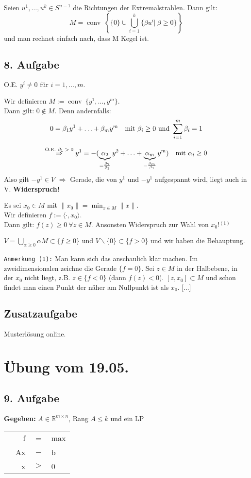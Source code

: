 \documentclass[a4paper,11pt,twoside,titlepage]{article}
\newcommand{\R}{{\mathbb R}}
\newcommand{\conv}{{\operatorname{conv}\:}}
\begin{document}
Seien $u^1,\ldots,u^k\in S^{n-1}$ die Richtungen der Extremalstrahlen. Dann gilt:
\[M=\conv\left\{\{0\}\cup\bigcup_{i=1}^k\{\beta u^i|\: \beta\geq 0\}\right\}\]
und man rechnet einfach nach, dass M Kegel ist.

\subsection*{8. Aufgabe}
O.E. $y^i\neq 0$ für $i=1,\ldots,m$.

Wir definieren $M:=\conv\{y^1,\ldots,y^m\}$.\\
Dann gilt: $0\not\in M$. Denn andernfalls:
\[0=\beta_1y^1+\ldots+\beta_my^m\quad\textnormal{mit }\beta_i\geq0\textnormal{ und }\sum_{i=1}^m\beta_i=1\]

\[\stackrel{\textnormal{\scriptsize{O.E. \ensuremath{\beta_1>0}}}}{\Rightarrow}y^1=-(\underbrace{\alpha_2}_{=\frac{\beta_2}{\beta_1}}y^2+\ldots+\underbrace{\alpha_m}_{=\frac{\beta_m}{\beta_1}}y^m)\quad\textnormal{mit }\alpha_i\geq0\]
Also gilt $-y^1\in V$ $\Rightarrow$ Gerade, die von $y^1$ und $-y^1$ aufgespannt wird, liegt auch in V. \textbf{Widerspruch!}


Es sei $x_0\in M$ mit $\|x_0\|=\min_{x\in M}\|x\|$.\\
Wir definieren $f:=\langle\cdot,x_0\rangle$.\\
Dann gilt: $f(z)\geq0\ \forall z\in M$. Ansonsten Widerspruch zur Wahl von $x_0$!$^{(1)}$

$V=\bigcup_{\alpha\geq0}\alpha M\subset\{f\geq0\}$ und $V\backslash\{0\}\subset\{f>0\}$ und wir haben die Behauptung.

\texttt{Anmerkung (1):} Man kann sich das anschaulich klar machen. Im zweidimensionalen zeichne die Gerade $\{f=0\}$. Sei $z\in M$ in der Halbebene, in der $x_0$ nicht liegt, z.B. $z\in \{f<0\}$ (dann $f(z)<0$). $[z,x_0]\subset M$ und schon findet man einen Punkt der näher am Nullpunkt ist als $x_0$. [...] 

\subsection*{Zusatzaufgabe}
Musterlösung online.


\newpage
\section{Übung vom 19.05.}
\subsection*{9. Aufgabe}
\textbf{Gegeben:} $A\in\R^{m\times n}$, Rang $A\leq k$ und ein LP
\begin{center}
\begin{tabular}{c|rcl|}\cline{2-4}
&f&=&max\\
&Ax&$=$&b\\
&x&$\geq$&0\\\cline{2-4}
\end{tabular}
\end{center}
\end{document}
